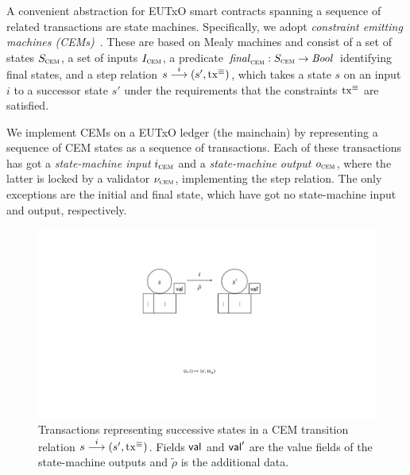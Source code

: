 A convenient abstraction for EUTxO smart contracts spanning a sequence
of related transactions are state machines. Specifically, we adopt
\emph{constraint emitting machines (CEMs)}~\cite{eutxo}. These are
based on Mealy machines and consist of a set of states $S_{\textsc{cem}}$, a set
of inputs $I_{\textsc{cem}}$, a predicate \(\mathit{final}_{\textsc{cem}} : S_{\textsc{cem}}\to\mathit{Bool}\)
identifying final states, and a step relation
\({s}\overset{i}\longrightarrow(s', \mathrm{tx}^\equiv)\), which takes a state $s$ on an
input $i$ to a successor state $s'$ under the requirements that the
constraints $\mathrm{tx}^\equiv$ are satisfied.

We implement CEMs on a EUTxO ledger (the mainchain) by representing a sequence of CEM states as a sequence of transactions. Each of these transactions has got a \emph{state-machine input} $i_{\textsc{cem}}$ and a \emph{state-machine output} $o_{\textsc{cem}}$, where the latter is locked by a validator $\nu_{\textsc{cem}}$, implementing the step relation. The only exceptions are the initial and final state, which have got no state-machine input and output, respectively.

\begin{figure}[t]
  \centering
  \includegraphics[scale=.2,width=\textwidth/2]{figures/state-transition_cropped.pdf}
  \caption{Transactions representing successive states in a CEM
    transition relation \({s}\overset{i}\longrightarrow(s', \mathrm{tx}^\equiv)\).  Fields
    $\mathsf{val}$ and $\mathsf{val}'$ are the value fields of the state-machine
    outputs and $\tilde \rho$ is the additional data.}
  \label{fig:state-transition}
\end{figure}

